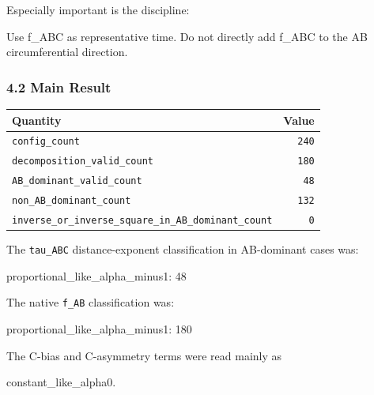 \documentclass[
]{article}
\newenvironment{Shaded}{}{}
\newcommand{\NormalTok}[1]{#1}
\newcounter{none} %
\begin{document}
Especially important is the discipline:

\begin{Shaded}
\begin{Highlighting}[]
\NormalTok{Use f\_ABC as representative time.}
\NormalTok{Do not directly add f\_ABC to the AB circumferential direction.}
\end{Highlighting}
\end{Shaded}

\subsubsection{4.2 Main Result}\label{main-result-2}

{\def\LTcaptype{none} %
\begin{longtable}[]{@{}lr@{}}
\toprule\noalign{}
Quantity & Value \\
\midrule\noalign{}
\endhead
\bottomrule\noalign{}
\endlastfoot
\texttt{config\_count} & \texttt{240} \\
\texttt{decomposition\_valid\_count} & \texttt{180} \\
\texttt{AB\_dominant\_valid\_count} & \texttt{48} \\
\texttt{non\_AB\_dominant\_count} & \texttt{132} \\
\texttt{inverse\_or\_inverse\_square\_in\_AB\_dominant\_count} &
\texttt{0} \\
\end{longtable}
}

The \texttt{tau\_ABC} distance-exponent classification in AB-dominant
cases was:

\begin{Shaded}
\begin{Highlighting}[]
\NormalTok{proportional\_like\_alpha\_minus1: 48}
\end{Highlighting}
\end{Shaded}

The native \texttt{f\_AB} classification was:

\begin{Shaded}
\begin{Highlighting}[]
\NormalTok{proportional\_like\_alpha\_minus1: 180}
\end{Highlighting}
\end{Shaded}

The C-bias and C-asymmetry terms were read mainly as

\begin{Shaded}
\begin{Highlighting}[]
\NormalTok{constant\_like\_alpha0.}
\end{Highlighting}
\end{Shaded}
\end{document}

